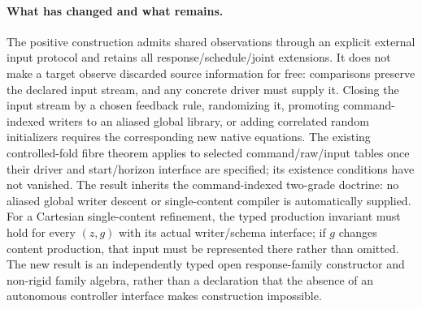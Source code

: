 \documentclass[11pt]{article}
\begin{document}
\paragraph{What has changed and what remains.}
The positive construction admits shared observations through an explicit external input protocol and retains all response/schedule/joint extensions. It does not make a target observe discarded source information for free: comparisons preserve the declared input stream, and any concrete driver must supply it. Closing the input stream by a chosen feedback rule, randomizing it, promoting command-indexed writers to an aliased global library, or adding correlated random initializers requires the corresponding new native equations. The existing controlled-fold fibre theorem applies to selected command/raw/input tables once their driver and start/horizon interface are specified; its existence conditions have not vanished. The result inherits the command-indexed two-grade doctrine: no aliased global writer descent or single-content compiler is automatically supplied. For a Cartesian single-content refinement, the typed production invariant must hold for every $(z,g)$ with its actual writer/schema interface; if $g$ changes content production, that input must be represented there rather than omitted. The new result is an independently typed open response-family constructor and non-rigid family algebra, rather than a declaration that the absence of an autonomous controller interface makes construction impossible.
\end{document}
